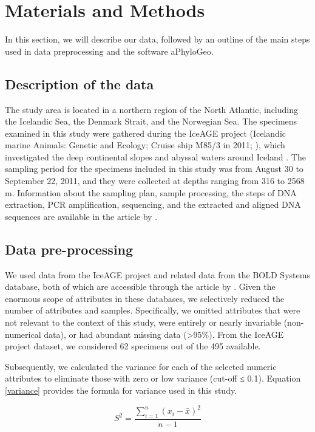 \section{Materials and Methods}\label{materials-methods}
In this section, we will describe our data, followed by an outline of the main steps used in data preprocessing and the software aPhyloGeo. 

\subsection{Description of the data}
The study area is located in a northern region of the North Atlantic, including the Icelandic Sea, the Denmark Strait, and the Norwegian Sea. The specimens examined in this study were gathered during the IceAGE project (Icelandic marine Animals: Genetic and Ecology; Cruise ship M85/3 in 2011; \cite{brix_iceage_2014}), which investigated the deep continental slopes and abyssal waters around Iceland \citep{meisner_prefacebiodiversity_2018}. The sampling period for the specimens included in this study was from August 30 to September 22, 2011, and they were collected at depths ranging from 316 to 2568 m.  Information about the sampling plan, sample processing, the steps of DNA extraction, PCR amplification, sequencing, and the extracted and aligned DNA sequences are available in the article by \cite{uhlir_adding_2021}.

\subsection{Data pre-processing}
We used data from the IceAGE project and related data from the BOLD Systems database, both of which are accessible through the article by \cite{uhlir_adding_2021}. Given the enormous scope of attributes in these databases, we selectively reduced the number of attributes and samples. Specifically, we omitted attributes that were not relevant to the context of this study, were entirely or nearly invariable (non-numerical data), or had abundant missing data (>95\%). From the IceAGE project dataset, we considered 62 specimens out of the 495 available.

Subsequently, we calculated the variance for each of the selected numeric attributes to eliminate those with zero or low variance (cut-off ≤ 0.1). Equation \ref{variance} provides the formula for variance used in this study.

\begin{equation}\label{variance}
    S^2 = \frac{\sum_{i=1}^{n} (x_i - \bar{x})^2}{n-1}
\end{equation}

